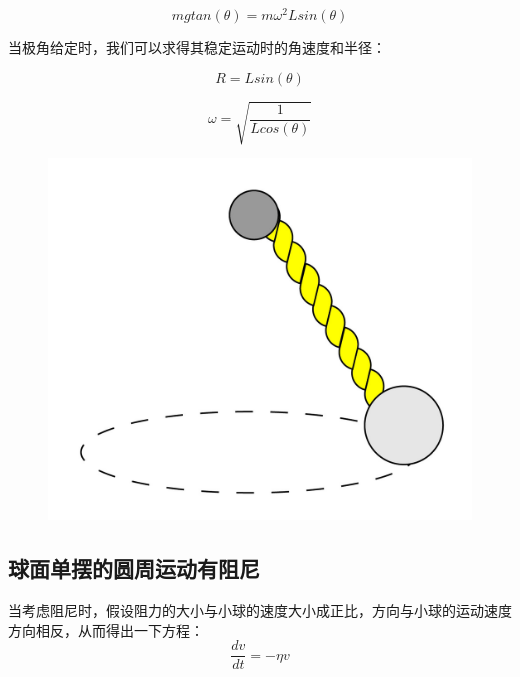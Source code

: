\documentclass[12pt,a4paper]{ctexart}
\begin{document}
		$$mg tan(\theta)=m\omega^2Lsin(\theta)$$
		
		当极角给定时，我们可以求得其稳定运动时的角速度和半径：
		
		$$R=Lsin(\theta)$$
		
		$$\omega=\sqrt{\frac{1}{Lcos(\theta)}}$$
	\hfill
	\begin{figure}[h] %
	\centering %
	\includegraphics[height=8\baselineskip]{T42.jpg} %
\end{figure}%

	\subsection{球面单摆的圆周运动有阻尼}
	当考虑阻尼时，假设阻力的大小与小球的速度大小成正比，方向与小球的运动速度方向相反，从而得出一下方程：
	$$\frac{dv}{dt}=-\eta v$$
	
\end{document}
